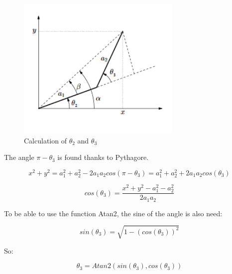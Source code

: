 \begin{figure}[h!]
	\centering
    \includegraphics[width = 0.7\textwidth]{Images/angles}
    \caption{Calculation of $\theta_2$ and $\theta_3$}
    \label{fig:DH}
\end{figure}

The angle $\pi - \theta_3$ is found thanks to Pythagore.\\

\begin{center}
	\begin{equation}
		x^2 + y^2 = a_1^2 + a_2^2 - 2a_1a_2cos(\pi - \theta_3) = a_1^2 + a_2^2 + 2a_1a_2cos(\theta_3)
	\end{equation}
\end{center}

\begin{center}
	\begin{equation}
		cos(\theta_3) = \frac{x^2 + y^2 - a_1^2 - a_2^2}{2a_1a_2}
	\end{equation}
\end{center}

To be able to use the function Atan2, the sine of the angle is also need:\\

\begin{center}
	\begin{equation}
		sin(\theta_3) = \sqrt{1 - (cos(\theta_3))^2}
	\end{equation}
\end{center}

So: \\

\begin{center}
	\begin{equation}
		\theta_3 = Atan2(sin(\theta_3),cos(\theta_3))
	\end{equation}
\end{center}

